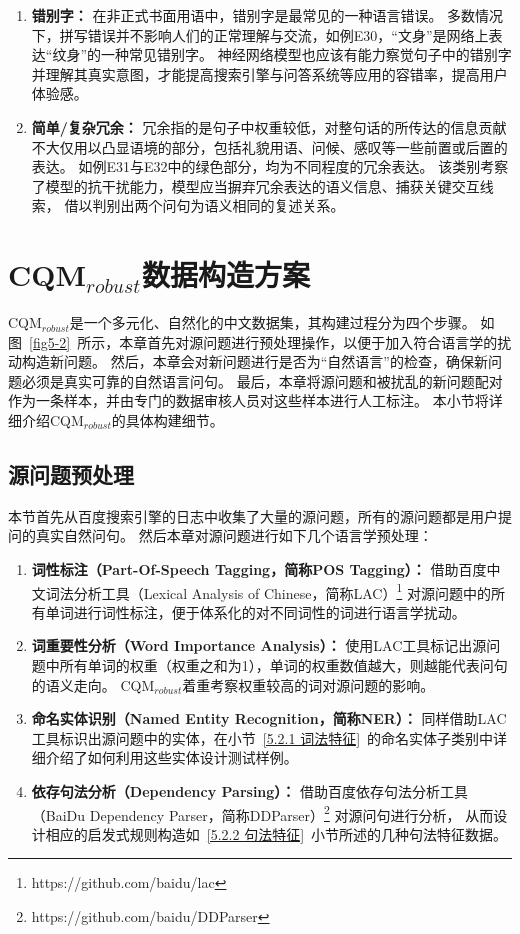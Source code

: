 \begin{enumerate}
    \item \textbf{错别字：}
    在非正式书面用语中，错别字是最常见的一种语言错误。
    多数情况下，拼写错误并不影响人们的正常理解与交流，如例E30，{\kai“文身”}是网络上表达{\kai“纹身”}的一种常见错别字。
    神经网络模型也应该有能力察觉句子中的错别字并理解其真实意图，才能提高搜索引擎与问答系统等应用的容错率，提高用户体验感。
    \item \textbf{简单/复杂冗余：}
    冗余指的是句子中权重较低，对整句话的所传达的信息贡献不大仅用以凸显语境的部分，包括礼貌用语、问候、感叹等一些前置或后置的表达。
    如例E31与E32中的绿色部分，均为不同程度的冗余表达。
    该类别考察了模型的抗干扰能力，模型应当摒弃冗余表达的语义信息、捕获关键交互线索，
    借以判别出两个问句为语义相同的复述关系。
\end{enumerate}


\section{CQM$_{robust}$数据构造方案}

CQM$_{robust}$是一个多元化、自然化的中文数据集，其构建过程分为四个步骤。
如图~\ref{fig5-2}~所示，本章首先对源问题进行预处理操作，以便于加入符合语言学的扰动构造新问题。
然后，本章会对新问题进行是否为“自然语言”的检查，确保新问题必须是真实可靠的自然语言问句。
最后，本章将源问题和被扰乱的新问题配对作为一条样本，并由专门的数据审核人员对这些样本进行人工标注。
本小节将详细介绍CQM$_{robust}$的具体构建细节。



\subsection{源问题预处理}

本节首先从百度搜索引擎的日志中收集了大量的源问题，所有的源问题都是用户提问的真实自然问句。
然后本章对源问题进行如下几个语言学预处理：

\begin{enumerate}
    \item \textbf{词性标注（Part-Of-Speech Tagging，简称POS Tagging）：}
    借助百度中文词法分析工具（Lexical Analysis of Chinese，简称LAC）\footnote{https://github.com/baidu/lac}
    对源问题中的所有单词进行词性标注，便于体系化的对不同词性的词进行语言学扰动。
    \item \textbf{词重要性分析（Word Importance Analysis）：}
    使用LAC工具标记出源问题中所有单词的权重（权重之和为1），单词的权重数值越大，则越能代表问句的语义走向。
    CQM$_{robust}$着重考察权重较高的词对源问题的影响。
    \item \textbf{命名实体识别（Named Entity Recognition，简称NER）：}
    同样借助LAC工具标识出源问题中的实体，在小节~\ref{5.2.1 词法特征}~的命名实体子类别中详细介绍了如何利用这些实体设计测试样例。   
    \item \textbf{依存句法分析（Dependency Parsing）：}
    借助百度依存句法分析工具（BaiDu Dependency Parser，简称DDParser）\footnote{https://github.com/baidu/DDParser}
    对源问句进行分析，
    从而设计相应的启发式规则构造如~\ref{5.2.2 句法特征}~小节所述的几种句法特征数据。
\end{enumerate}

